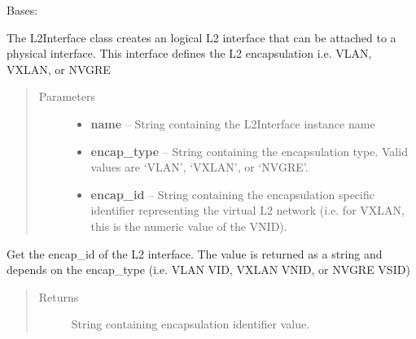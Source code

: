 \documentclass[letterpaper,10pt,english]{sphinxmanual}
\begin{document}

\begin{fulllineitems}
\label{acitoolkit:acitoolkit.L2Interface}
Bases: {\hyperref[acibaseobject:acibaseobject.BaseACIObject]{}}

The L2Interface class creates an logical L2 interface that can be        attached to a physical interface. This interface defines the L2        encapsulation i.e. VLAN, VXLAN, or NVGRE
\begin{quote}\begin{description}
\item[{Parameters}] \leavevmode\begin{itemize}
\item {} 
\textbf{name} -- String containing the L2Interface instance name

\item {} 
\textbf{encap\_type} -- String containing the encapsulation type.        Valid values are `VLAN', `VXLAN', or `NVGRE'.

\item {} 
\textbf{encap\_id} -- String containing the encapsulation specific        identifier representing the virtual L2 network (i.e. for VXLAN,        this is the numeric value of the VNID).

\end{itemize}

\end{description}\end{quote}

\begin{fulllineitems}
\label{acitoolkit:acitoolkit.L2Interface.get_encap_id}
Get the encap\_id of the L2 interface.
The value is returned as a string and depends on the encap\_type
(i.e. VLAN VID, VXLAN VNID, or NVGRE VSID)
\begin{quote}\begin{description}
\item[{Returns}] \leavevmode
String containing encapsulation identifier value.

\end{description}\end{quote}

\end{fulllineitems}


\end{fulllineitems}
\end{document}
